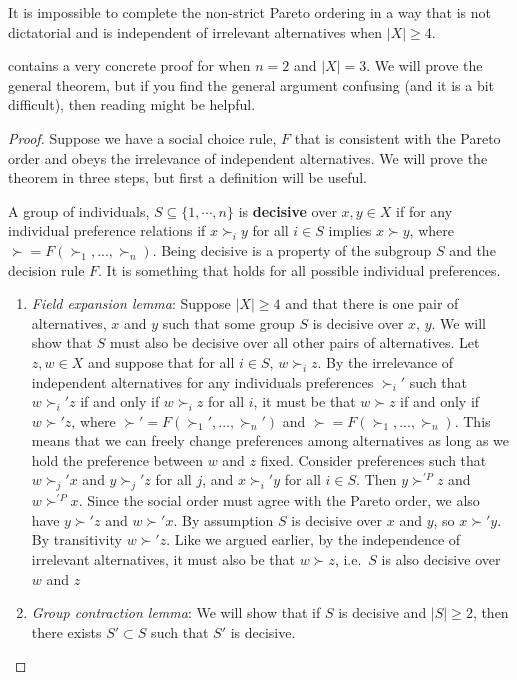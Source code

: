 \begin{theorem}
  It is impossible to complete the non-strict Pareto ordering in a way that
  is not dictatorial and is independent of irrelevant alternatives
  when $|X| \geq 4$. 
\end{theorem}
\cite{feldman1974} contains a very concrete proof for when $n=2$ and
$|X|=3$. We will prove the general theorem, but if you find the
general argument confusing (and it is a bit difficult), then reading
\cite{feldman1974} might be helpful.
\begin{proof}
  Suppose we have a social choice rule, $F$ that is consistent with
  the Pareto order and obeys the irrelevance of independent
  alternatives. We will prove the theorem in three steps, but first a
  definition will be useful.

  A group of individuals, $S \subseteq \{1,\cdots,n\}$ is
  \textbf{decisive} over $x, y \in X$ if for any individual preference
  relations if $x \succ_i y$ for all $i \in S$ implies $x \succ y$,
  where $\succ=F(\succ_1,..., \succ_n)$. Being decisive is a property
  of the subgroup $S$ and the decision rule $F$. It is something that
  holds for all possible individual preferences.
  
  \begin{enumerate}
  \item \emph{Field expansion lemma}: Suppose $|X|\geq 4$ and that there is one pair of
    alternatives, $x$ and $y$ such that some group $S$ is decisive
    over $x$, $y$.  We will show that $S$ must also be decisive over
    all other pairs of alternatives.  Let $z, w\in X$ and suppose that
    for all $i \in S$, $w \succ_i z$. By the irrelevance of
    independent alternatives for any individuals preferences
    $\succ_i'$ such that $w \succ_i' z$ if and only if $w \succ_i z$ for all $i$,
    it must be that $w \succ z$ if and only if $w \succ' z$, where
    $\succ'=F(\succ_1',...,\succ_n')$ and
    $\succ=F(\succ_1,...,\succ_n)$.  This means that we can freely
    change preferences among alternatives as long as we hold the
    preference between $w$ and $z$ fixed. Consider preferences such
    that $w \succ_j' x$ and $y \succ_j' z$ for all $j$, and $x
    \succ_i' y$ for all $i \in S$. Then $y \succ^{'P} z$ and $w
    \succ^{'P} x$. Since the social order must agree with the Pareto
    order, we also have $y \succ' z$ and $w \succ' x$. By assumption
    $S$ is decisive over $x$ and $y$, so $x \succ' y$. By transitivity
    $w \succ' z$. Like we argued earlier, by the independence of
    irrelevant alternatives, it must also be that $w \succ z$, i.e.\
    $S$ is also decisive over $w$ and $z$
  \item \emph{Group contraction lemma}: We will show that if $S$ is
    decisive and $|S| \geq 2$, then there exists $S' \subset S$ such
    that $S'$ is decisive. 
    

\end{enumerate}
\end{proof}
